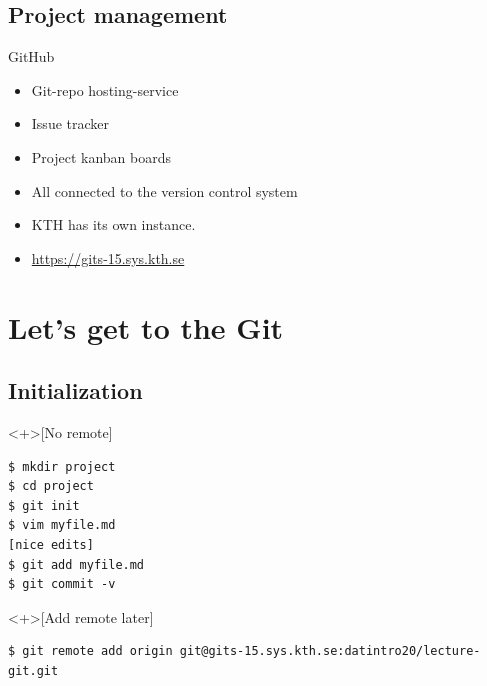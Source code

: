 \subsection{Project management}

\begin{frame}
  \begin{block}{GitHub}
    \begin{itemize}
      \item Git-repo hosting-service
      \item Issue tracker
      \item Project kanban boards
      \item All connected to the version control system
    \end{itemize}
  \end{block}
\end{frame}


\begin{frame}
  \begin{remark}
    \begin{itemize}
      \item KTH has its own instance.
      \item \url{https://gits-15.sys.kth.se}
    \end{itemize}
  \end{remark}
\end{frame}


\section{Let's get to the Git}

\subsection{Initialization}

\begin{frame}[fragile]
  \begin{example}<+>[No remote]
    \begin{lstlisting}
$ mkdir project
$ cd project
$ git init
$ vim myfile.md
[nice edits]
$ git add myfile.md
$ git commit -v
    \end{lstlisting}
  \end{example}

  \pause

  \begin{example}<+>[Add remote later]
    \begin{lstlisting}
$ git remote add origin git@gits-15.sys.kth.se:datintro20/lecture-git.git
    \end{lstlisting}
  \end{example}
\end{frame}

